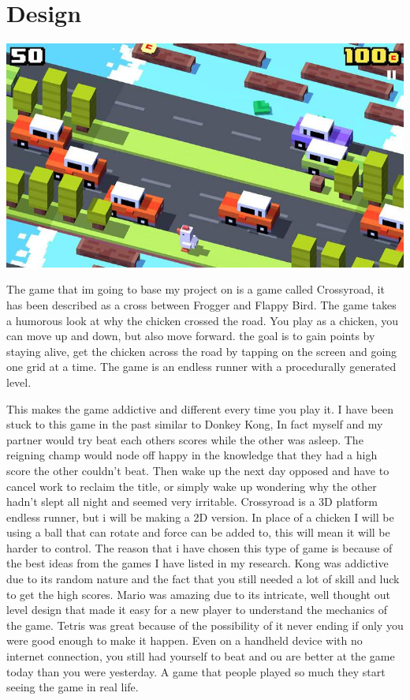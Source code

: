 \documentclass{article}
\begin{document}
\section{Design}
\begin{minipage}{0.4\textwidth}
\includegraphics[width=\linewidth]{crossyroad}
\end{minipage} \hfill
\begin{minipage}{0.55\textwidth}\raggedright
The game that im going to base my project on is a game called Crossyroad, it has been described as a cross between Frogger and Flappy Bird. The game takes a humorous look at why the chicken crossed the road. You play as a chicken, you can move up and down, but also move forward. the goal is to gain points by staying alive, get the chicken across the road by tapping on the screen and going one grid at a time. The game is an endless runner with a procedurally generated level.
\end{minipage} \newline
This makes the game addictive and different every time you play it. I have been stuck to this game in the past similar to Donkey Kong, In fact myself and my partner would try beat each others scores while the other was asleep. The reigning champ would node off happy in the knowledge that they had a high score the other couldn't beat. Then wake up the next day opposed and have to cancel work to reclaim the title, or simply wake up wondering why the other hadn't slept all night and seemed very irritable. \newline
Crossyroad is a 3D platform endless runner, but i will be making a 2D version. In place of a chicken I will be using a ball that can rotate and force can be added to, this will mean it will be harder to control. The reason that i have chosen this type of game is because of the best ideas from the games I have listed in my research. Kong was addictive due to its random nature and the fact that you still needed a lot of skill and luck to get the high scores. Mario was amazing due to its intricate, well thought out level design that made it easy for a new player to understand the mechanics of the game. Tetris was great because of the possibility of it never ending if only you were good enough to make it happen. Even on a handheld device with no internet connection, you still had yourself to beat and ou are better at the game today than you were yesterday. A game that people played so much they start seeing the game in real life.
\end{document}
